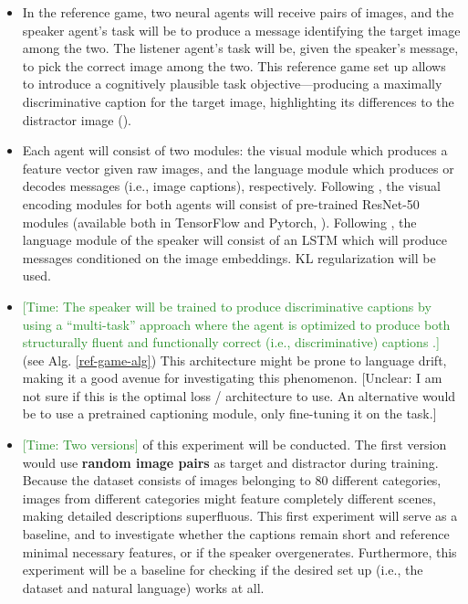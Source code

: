 \documentclass[11pt,letterpaper]{article}
\newcommand{\unclear}[1]{\textcolor{Cerulean}{[Unclear: #1]}}
\newcommand{\timing}[1]{\textcolor{ForestGreen}{[Time: #1]}}
\begin{document}
\begin{enumerate}
\begin{itemize}
	\item In the reference game, two neural agents will receive pairs of images, and the speaker agent's task will be to produce a message identifying the target image among the two. The listener agent's task will be, given the speaker's message, to pick the correct image among the two. This reference game set up allows to introduce a cognitively plausible task objective---producing a maximally discriminative caption for the target image, highlighting its differences to the distractor image (\cite{andreas2016reasoning, dai2017contrastive, vedantam2017context, nie2020pragmatic}). 
	\item Each agent will consist of two modules: the visual module which produces a feature vector given raw images, and the language module which produces or decodes messages (i.e., image captions), respectively. 
	Following \cite{lazaridou2020multi}, the visual encoding modules for both agents will consist of pre-trained ResNet-50 modules (available both in TensorFlow and Pytorch, \cite{he2016deep}). Following \cite{vinyals2015show}, the language module of the speaker will consist of an LSTM which will produce messages conditioned on the image embeddings. KL regularization will be used. 
	\item \timing{The speaker will be trained to produce discriminative captions by using a ``multi-task'' approach where the agent is optimized to produce both structurally fluent and functionally correct (i.e., discriminative) captions \cite{lazaridou2020multi}.} (see Alg. \ref{ref-game-alg}) This architecture might be prone to language drift, making it a good avenue for investigating this phenomenon.
	\unclear{I am not sure if this is the optimal loss / architecture to use. An alternative would be to use a pretrained captioning module, only fine-tuning it on the task.}
	\item \timing{Two versions} of this experiment will be conducted. The first version would use \textbf{random image pairs} as target and distractor during training. Because the dataset consists of images belonging to 80 different categories, images from different categories might feature completely different scenes, making detailed descriptions superfluous. This first experiment will serve as a baseline, and to investigate whether the captions remain short and reference minimal necessary features, or if the speaker overgenerates. Furthermore, this experiment will be a baseline for checking if the desired set up (i.e., the dataset and natural language) works at all. 

\end{itemize}
\end{enumerate}
\end{document}
